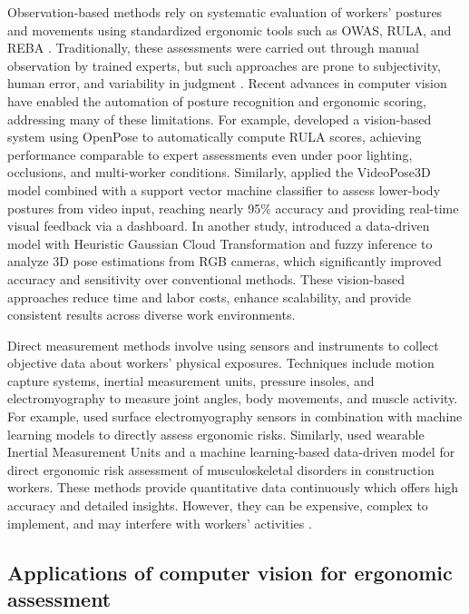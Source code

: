 \documentclass[11pt]{article}
\begin{document}
Observation-based methods rely on systematic evaluation of workers’ postures and movements using standardized ergonomic tools such as OWAS, RULA, and REBA \citep{lamooki2022data}. Traditionally, these assessments were carried out through manual observation by trained experts, but such approaches are prone to subjectivity, human error, and variability in judgment \citep{zhang2017real}. Recent advances in computer vision have enabled the automation of posture recognition and ergonomic scoring, addressing many of these limitations. For example, \citet{massirisfernandez2020ergonomic} developed a vision-based system using OpenPose to automatically compute RULA scores, achieving performance comparable to expert assessments even under poor lighting, occlusions, and multi-worker conditions. Similarly, \citet{tao2023postural} applied the VideoPose3D model combined with a support vector machine classifier to assess lower-body postures from video input, reaching nearly 95\% accuracy and providing real-time visual feedback via a dashboard. In another study, \citet{li2024data} introduced a data-driven model with Heuristic Gaussian Cloud Transformation and fuzzy inference to analyze 3D pose estimations from RGB cameras, which significantly improved accuracy and sensitivity over conventional methods. These vision-based approaches reduce time and labor costs, enhance scalability, and provide consistent results across diverse work environments. 

Direct measurement methods involve using sensors and instruments to collect objective data about workers' physical exposures. Techniques include motion capture systems, inertial measurement units, pressure insoles, and electromyography to measure joint angles, body movements, and muscle activity. For example, \citet{mudiyanselage2021automated} used surface electromyography sensors in combination with machine learning models to directly assess ergonomic risks. Similarly, \citet{zhao2018health} used wearable Inertial Measurement Units and a machine learning-based data-driven model for direct ergonomic risk assessment of musculoskeletal disorders in construction workers. These methods provide quantitative data continuously which offers high accuracy and detailed insights. However, they can be expensive, complex to implement, and may interfere with workers' activities \citep{li2024data}. 

\subsection{Applications of computer vision for ergonomic assessment}
\end{document}
